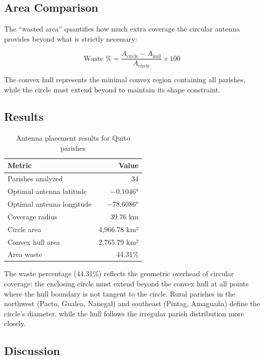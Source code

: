 \documentclass[11pt,a4paper]{article}
\begin{document}
\subsection{Area Comparison}

The ``wasted area'' quantifies how much extra coverage the circular antenna provides beyond what is strictly necessary:

\begin{equation}
    \text{Waste \%} = \frac{A_{\text{circle}} - A_{\text{hull}}}{A_{\text{circle}}} \times 100
\end{equation}

The convex hull represents the minimal convex region containing all parishes, while the circle must extend beyond to maintain its shape constraint.

\subsection{Results}

\begin{table}[h]
\centering
\begin{tabular}{|l|r|}
\hline
\textbf{Metric} & \textbf{Value} \\
\hline
Parishes analyzed & 34 \\
Optimal antenna latitude & $-0.1046°$ \\
Optimal antenna longitude & $-78.6086°$ \\
Coverage radius & 39.76 km \\
Circle area & 4,966.78 km² \\
Convex hull area & 2,765.79 km² \\
Area waste & 44.31\% \\
\hline
\end{tabular}
\caption{Antenna placement results for Quito parishes}
\label{tab:antenna-results}
\end{table}

The waste percentage (44.31\%) reflects the geometric overhead of circular coverage: the enclosing circle must extend beyond the convex hull at all points where the hull boundary is not tangent to the circle. Rural parishes in the northwest (Pacto, Gualea, Nanegal) and southeast (Pintag, Amaguaña) define the circle's diameter, while the hull follows the irregular parish distribution more closely.

\subsection{Discussion}
\end{document}
